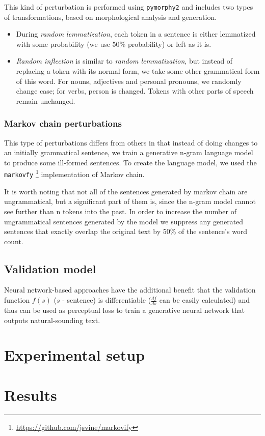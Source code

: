 \documentclass[11pt,a4paper]{article}
\begin{document}
This kind of perturbation is performed using \texttt{pymorphy2} \cite{pymorphy2} and includes two types of transformations, based on morphological analysis and generation.

\begin{itemize}
    \item During \emph{random lemmatization}, each token in a sentence is either lemmatized with some probability (we use 50\% probability) or left as it is.
    \item \emph{Random inflection} is similar to \emph{random lemmatization}, but instead of replacing a token with its normal form, we take some other grammatical form of this word. For nouns, adjectives and personal pronouns, we randomly change case; for verbs, person is changed. Tokens with other parts of speech remain unchanged.
\end{itemize}

\subsubsection{Markov chain perturbations}

This type of perturbations differs from others in that instead of doing changes to an initially grammatical sentence, we train a generative n-gram language model to produce some ill-formed sentences. To create the language model, we used the \texttt{markovfy} \footnote{\url{https://github.com/jsvine/markovify}} implementation of Markov chain.

It is worth noting that not all of the sentences generated by markov chain are ungrammatical, but a significant part of them is, since the n-gram model cannot see further than n tokens into the past. In order to increase the number of ungrammatical sentences generated by the model we suppress any generated sentences that exactly overlap the original text by 50\% of the sentence's word count.

\subsection{Validation model}

Neural network-based approaches have the additional benefit that the validation function $f(s)$ ($s$ - sentence) is differentiable ($\frac{df}{ds}$ can be easily calculated) and thus can be used as perceptual loss \cite{perceptualloss} to train a generative neural network that outputs natural-sounding text.

\section{Experimental setup}
\label{sec:setup}

\section{Results}
\label{sec:results}


\end{document}
